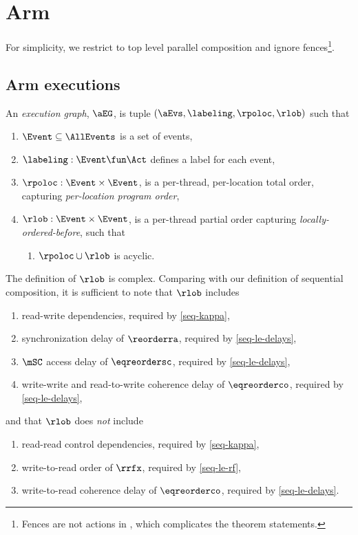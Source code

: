 \section{Arm}
\label{sec:arm}
For simplicity, we restrict to top level parallel composition and ignore
fences\footnote{Fences are not actions in \armeight{}, which complicates the
  theorem statements.}.

\subsection{Arm executions}
\begin{definition}
  An \emph{\armeight{} execution graph}, $\aEG$, is tuple
  $(\aEvs, \labeling, {\rpoloc}, {\rlob})$ such that
  \begin{enumerate}[,label=(\textsc{a}\arabic*),ref=\textsc{a}\arabic*]
  \item $\Event\subseteq\AllEvents$ is a set of {events},
  \item $\labeling: \Event \fun \Act$ defines a {label} for each event,
  \item ${\rpoloc} : \Event\times\Event$, is a per-thread, per-location total
    order, capturing \emph{per-location program order},
  \item ${\rlob} : \Event\times\Event$, is a per-thread partial order capturing
    \emph{locally-ordered-before}, such that
    \begin{enumerate}
    \item \label{arm-lob-poloc}
      ${\rpoloc} \cup {\rlob}$ is acyclic.
    \end{enumerate}
  \end{enumerate}
\end{definition}

The definition of $\rlob$ is complex.  Comparing with our definition of
sequential composition, it is sufficient to note that $\rlob$ includes
\begin{enumerate}[label=(\textsc{l}\arabic*),ref=\textsc{l}\arabic*]
\item read-write dependencies, required by \ref{seq-kappa},
\item synchronization delay of ${\reorderra}$, required by \ref{seq-le-delays},
\item $\mSC$ access delay of ${\eqreordersc}$, required by \ref{seq-le-delays},
\item write-write and read-to-write coherence delay of ${\eqreorderco}$, required by \ref{seq-le-delays},
\end{enumerate}
and that $\rlob$ does \emph{not} include
\begin{enumerate}[resume,label=(\textsc{l}\arabic*),ref=\textsc{l}\arabic*]
\item \label{lob-rr} 
  read-read control dependencies, required by \ref{seq-kappa},
\item \label{lob-rf}
  write-to-read order of $\rrfx$, required by \ref{seq-le-rf},
\item \label{lob-wr}
  write-to-read coherence delay of ${\eqreorderco}$, required by \ref{seq-le-delays}.
\end{enumerate}


